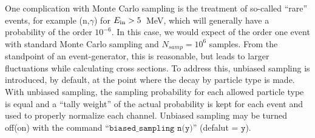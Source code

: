 \documentclass[
10pt,
showpacs,preprintnumbers,footinbib,
amsfonts,amsmath,amssymb,
aps,
prc,twocolumn,groupedaddress,superscriptaddress,
showkeys,
nofootinbib
]{revtex4-1}
\begin{document}
One complication with Monte Carlo sampling is the treatment of so-called ``rare'' events, for example (n,$\gamma$) for $E_{\rm in} > 5$~MeV, which will generally have a probability of the order $10^{-6}$. In this case, we would expect of the order one event with standard Monte Carlo sampling and $N_{samp}=10^6$ samples. From the standpoint of an event-generator, this is reasonable, but leads to larger fluctuations while calculating cross sections. To address this, unbiased sampling is introduced, by default, at the point where the decay by particle type is made. With unbiased sampling, the sampling probability for each allowed particle type is equal and a ``tally weight'' of the actual probability is kept for each event and used to properly normalize each channel. Unbiased sampling may be turned off(on) with the command ``${\texttt{biased\_sampling n(y)}}$'' (defalut = ${\texttt{y}}$).
\end{document}

